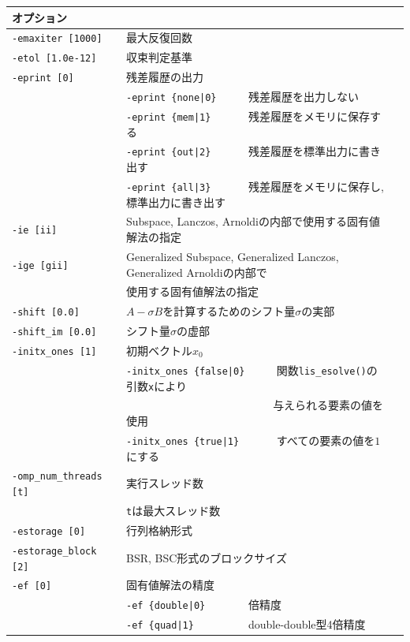 \documentclass[a4paper]{jarticle}
\begin{document}
{{\begin{minipage}[t]{\textwidth}
\begin{center}
\begin{tabular}{l|ll}
オプション &                          \\ \hline
\verb=-emaxiter [1000]= & 最大反復回数         \\ 
\verb=-etol [1.0e-12]=  & 収束判定基準              \\
\verb=-eprint [0]=      & 残差履歴の出力                 \\
                       & \verb=-eprint {none|0}     =  残差履歴を出力しない \\
                       & \verb=-eprint {mem|1}      =  残差履歴をメモリに保存する\\
                       & \verb=-eprint {out|2}      =  残差履歴を標準出力に書き出す\\
                       & \verb=-eprint {all|3}      =  残差履歴をメモリに保存し, 標準出力に書き出す\\
\verb=-ie [ii]= & Subspace, Lanczos, Arnoldiの内部で使用する固有値解法の指定  \\
\verb=-ige [gii]= & Generalized Subspace, Generalized Lanczos, Generalized Arnoldiの内部で\\
                       & 使用する固有値解法の指定  \\
\verb=-shift [0.0]= & $A-\sigma B$を計算するためのシフト量$\sigma$の実部 \\
\verb=-shift_im [0.0]= & シフト量$\sigma$の虚部 \\
\verb=-initx_ones [1]= & 初期ベクトル$x_{0}$  \\
                       & \verb=-initx_ones {false|0}     =  関数\verb=lis_esolve()=の引数\verb=x=により \\
                       & \verb=                          =  与えられる要素の値を使用 \\
                       & \verb=-initx_ones {true|1}      =  すべての要素の値を$1$にする\\
\verb=-omp_num_threads [t]= & 実行スレッド数         \\ 
                            & \verb=t=は最大スレッド数 \\
\verb=-estorage [0]=   & 行列格納形式 \\
\verb=-estorage_block [2]= & BSR, BSC形式のブロックサイズ \\ 
\verb=-ef [0]=         & 固有値解法の精度 \\
                       & \verb=-ef {double|0}       =   倍精度 \\
                       & \verb=-ef {quad|1}         =   double-double型4倍精度 \\

\end{tabular}
\end{center}
\end{minipage}}}
\end{document}
